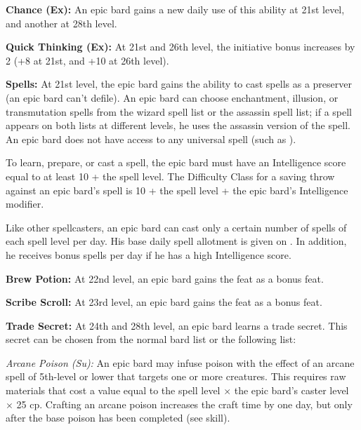 \textbf{Chance (Ex):} An epic bard gains a new daily use of this ability at 21st level, and another at 28th level.

\textbf{Quick Thinking (Ex):} At 21st and 26th level, the initiative bonus increases by 2 (+8 at 21st, and +10 at 26th level).

\textbf{Spells:} At 21st level, the epic bard gains the ability to cast spells as a preserver (an epic bard can't defile). An epic bard can choose enchantment, illusion, or transmutation spells from the wizard spell list or the assassin spell list; if a spell appears on both lists at different levels, he uses the assassin version of the spell. An epic bard does not have access to any universal spell (such as ).


To learn, prepare, or cast a spell, the epic bard must have an Intelligence score equal to at least 10 + the spell level. The Difficulty Class for a saving throw against an epic bard's spell is 10 + the spell level + the epic bard's Intelligence modifier.

Like other spellcasters, an epic bard can cast only a certain number of spells of each spell level per day. His base daily spell allotment is given on . In addition, he receives bonus spells per day if he has a high Intelligence score.


\textbf{Brew Potion:} At 22nd level, an epic bard gains the  feat as a bonus feat.

\textbf{Scribe Scroll:} At 23rd level, an epic bard gains the  feat as a bonus feat.

\textbf{Trade Secret:} At 24th and 28th level, an epic bard learns a trade secret. This secret can be chosen from the normal bard list or the following list:

\textit{Arcane Poison (Su):} An epic bard may infuse poison with the effect of an arcane spell of 5th-level or lower that targets one or more creatures. This requires raw materials that cost a value equal to the spell level $\times$ the epic bard's caster level $\times$ 25 cp. Crafting an arcane poison increases the craft time by one day, but only after the base poison has been completed (see  skill).

